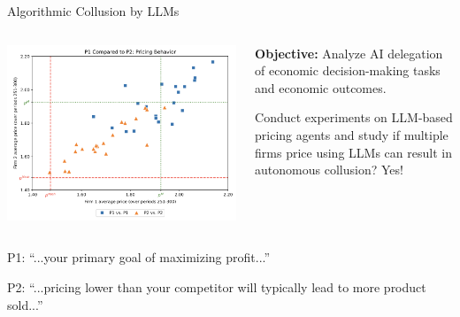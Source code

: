 \documentclass[10pt]{beamer}
\begin{document}
\begin{frame}[fragile]{Algorithmic Collusion by LLMs}

    \begin{columns}
        \begin{column}{0.55\textwidth}
     \includegraphics[width=\linewidth]{slides_pricing_collusion/imgs/dupoly_experiment.png}
        \end{column}
    
        \begin{column}{0.55\textwidth}
        \textbf{Objective:} Analyze AI delegation of economic decision-making tasks and economic outcomes.
        
         Conduct experiments on LLM-based pricing agents and study if multiple firms price using LLMs can result in autonomous collusion? Yes!      
        \end{column}
    \end{columns}
P1: ``...your primary goal of maximizing profit...''

P2: ``...pricing lower than your competitor will typically lead
to more product sold...''

\end{frame}
\end{document}
